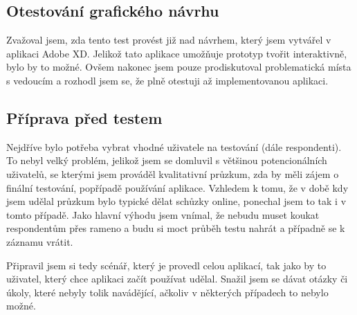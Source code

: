 \subsection{Otestování grafického návrhu}

Zvažoval jsem, zda tento test provést již nad návrhem, který jsem vytvářel v aplikaci Adobe XD. Jelikož tato aplikace umožňuje
prototyp tvořit interaktivně, bylo by to možné. Ovšem nakonec jsem pouze prodiskutoval problematická místa s vedoucím a rozhodl jsem
se, že plně otestuji až implementovanou aplikaci.

\subsection{Příprava před testem}

Nejdříve bylo potřeba vybrat vhodné uživatele na testování (dále respondenti). To nebyl velký problém, jelikož jsem se domluvil s většinou potencionálních
uživatelů, se kterými jsem prováděl kvalitativní průzkum, zda by měli zájem o finální testování, popřípadě používání aplikace.
Vzhledem k tomu, že v době kdy jsem udělal průzkum bylo typické dělat schůzky online, ponechal jsem to tak i v tomto případě.
Jako hlavní výhodu jsem vnímal, že nebudu muset koukat respondentům přes rameno a budu si moct průběh testu nahrát a případně se
k záznamu vrátit.

Připravil jsem si tedy scénář, který je provedl celou aplikací, tak jako by to uživatel, který chce aplikaci začít používat udělal.
Snažil jsem se dávat otázky či úkoly, které nebyly tolik navádějící, ačkoliv v některých případech to nebylo možné.

